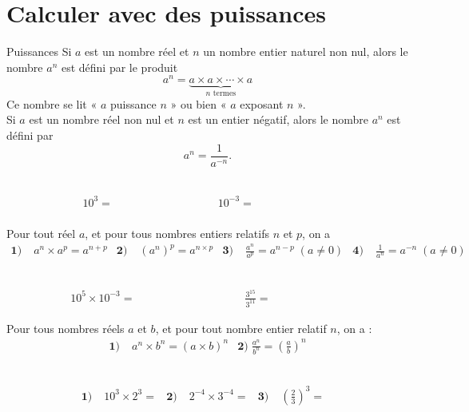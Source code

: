 \documentclass[11pt]{article}
\begin{document}
\section{Calculer avec des puissances}
\begin{defi}{Puissances}
 Si $a$ est un nombre réel et $n$ un nombre entier naturel non nul, alors le
 nombre $a^n$ est défini par le produit
 \[
   a^n = \underbrace{a\times a\times \cdots\times a}_{n\text{ termes}}
 \]
 Ce nombre se lit « $a$ puissance $n$ » ou bien « $a$ exposant $n$ ».\\[1mm]
 Si $a$ est un nombre réel non nul et $n$ est un entier négatif, alors le nombre
 $a^n$ est défini par
 \[
   a^n = \frac{1}{a^{-n}}.
 \]
\end{defi}
\begin{app}~\\[-11mm]
  \begin{align*}
    & 10^3 =\phantom{ 10\times10\times10 = 1000 }&
    10^{-3} =\phantom{\frac{1}{10^3} = \frac{1}{1000}=0,001}
  \end{align*}
\end{app}
\begin{prop}
  Pour tout réel $a$, et pour tous nombres entiers relatifs $n$ et $p$, on a
  \begin{align*}
    \textbf{1)}\;& a^n\times a^p=a^{n+p} &
    \textbf{2)}\;& \left( a^n \right)^p=a^{n\times p} &
    \textbf{3)}\;& \frac{a^n}{a^p} = a^{n-p}\;(a\neq0) &
    \textbf{4)}\;& \frac{1}{a^n}=a^{-n}\;(a\neq0)
  \end{align*}
\end{prop}
\begin{app}~\\[-11mm]
  \begin{align*}
    & 10^5\times10^{-3}=\phantom{10^{5-3}=10^2=100 }&
    & \frac{3^{15}}{3^{11}}=\phantom{ 3^{15-11}=3^4=81}
  \end{align*}
\end{app}

\begin{prop}
  Pour tous nombres réels $a$ et $b$, et pour tout nombre entier relatif $n$, on
  a :
  \begin{align*}
    \textbf{1)}\; & a^n\times b^n = (a\times b)^n & \textbf{2)}\;\frac{a^n}{b^n}=\left( \frac{a}{b}
    \right)^n
  \end{align*}
\end{prop}
\begin{app}~\\[-11mm]
  \begin{align*}
    \textbf{1)}\;& 10^3\times2^3 = &
    \textbf{2)}\;& 2^{-4}\times3^{-4} = &
    \textbf{3)}\;& \left( \frac{2}{3} \right)^3 = &
  \end{align*}
\end{app}
\end{document}

